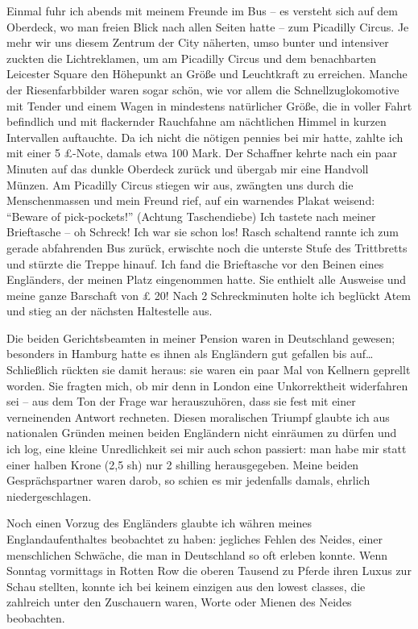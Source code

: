 Einmal fuhr ich abends mit meinem Freunde im Bus -- es versteht sich auf dem Oberdeck, wo man freien Blick nach allen Seiten hatte -- zum Picadilly Circus. Je mehr wir uns diesem Zentrum der City näherten, umso bunter und intensiver zuckten die Lichtreklamen, um am Picadilly Circus und dem benachbarten Leicester Square den Höhepunkt an Größe und Leuchtkraft zu erreichen. Manche der Riesenfarbbilder waren sogar schön, wie vor allem die Schnellzuglokomotive mit Tender und einem Wagen in mindestens natürlicher Größe, die in voller Fahrt befindlich und mit flackernder Rauchfahne am nächtlichen Himmel in kurzen Intervallen auftauchte. Da ich nicht die nötigen pennies bei mir hatte, zahlte ich mit einer 5 £-Note, damals etwa 100 Mark. Der Schaffner kehrte nach ein paar Minuten auf das dunkle Oberdeck zurück und übergab mir eine Handvoll Münzen. Am Picadilly Circus stiegen wir aus, zwängten uns durch die Menschenmassen und mein Freund rief, auf ein warnendes Plakat weisend: \enquote{Beware of pick-pockets!} (Achtung Taschendiebe) Ich tastete nach meiner Brieftasche -- oh Schreck! Ich war sie schon los! Rasch schaltend rannte ich zum gerade abfahrenden Bus zurück, erwischte noch die unterste Stufe des Trittbretts und stürzte die Treppe hinauf. Ich fand die Brieftasche vor den Beinen eines Engländers, der meinen Platz eingenommen hatte. Sie enthielt alle Ausweise und meine ganze Barschaft von £ 20! Nach 2 Schreckminuten holte ich beglückt Atem und stieg an der nächsten Haltestelle aus.

Die beiden Gerichtsbeamten in meiner Pension waren in Deutschland gewesen; besonders in Hamburg hatte es ihnen als Engländern gut gefallen bis auf\dots Schließlich rückten sie damit heraus: sie waren ein paar Mal von Kellnern geprellt worden. Sie fragten mich, ob mir denn in London eine Unkorrektheit widerfahren sei -- aus dem Ton der Frage war herauszuhören, dass sie fest mit einer verneinenden Antwort rechneten. Diesen moralischen Triumpf glaubte ich aus nationalen Gründen meinen beiden Engländern nicht einräumen zu dürfen und ich log, eine kleine Unredlichkeit sei mir auch schon passiert: man habe mir statt einer halben Krone (2,5 sh) nur 2 shilling herausgegeben. Meine beiden Gesprächspartner waren darob, so schien es mir jedenfalls damals, ehrlich niedergeschlagen.

Noch einen Vorzug des Engländers glaubte ich währen meines Englandaufenthaltes beobachtet zu haben: jegliches Fehlen des Neides, einer menschlichen Schwäche, die man in Deutschland so oft erleben konnte. Wenn Sonntag vormittags in Rotten Row die oberen Tausend zu Pferde ihren Luxus zur Schau stellten, konnte ich bei keinem einzigen aus den lowest classes, die zahlreich unter den Zuschauern waren, Worte oder Mienen des Neides beobachten.

